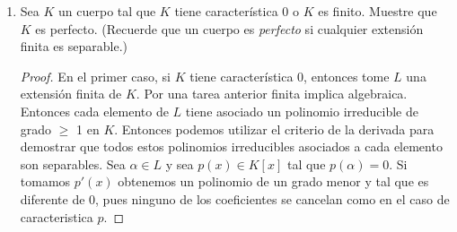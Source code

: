 \documentclass[letter,twoside,12pt]{article}
\begin{document}
\begin{enumerate}
\begin{enumerate}
\begin{proof}
Que era el resultado que estabamos buscando. Por lo tanto $ S $ es un campo y como contiene a todas las raices del polinomo $ f_n(x) $ entonces debe coincidir con el campo de descomposición $ \mathbb{F}_{p^n} $ puesto que por definición es el mínimo campo que contiene a todas las raíces del polinomio dado.
\end{proof}
\item Muestre que $ |\mathbb{F}{p^n}| = p^n $ y que más aun $ F_{p^n} $ es el único cuerpo, módulo isomorfismo, con esta cardinalidad.
En otras palabras muestre que si $ L $ es un cuerpo tal que $ |L| = p_n $ entonces $ F_{p^n} \cong
L $.

\begin{proof}
Como el polinomio no tiene raíces repetidas su número de raíces es igual a su grado, es decir, $ |\mathbb{F}^{p^n}| =p^n$. Ahora para demostrar que cualquier otro campo $ L $ con tamaño $ p^n $ es esencialmente el mismo campo solo basta demostrar que para cualquier $ \alpha \in L $ se cumple que $ (\alpha)^{p^n}=\alpha $.

Debemos considerar dos casos. Si $ \alpha=0 $ entonces $ 0^{p^n} = 0 $. Si $ \alpha \not  = 0 $ entonces $ \alpha \in L^* $. Ya tenemos un teorema que nos dice que $ L^* $ es un grupo cíclico de tamaño $ p^n-1 $. Por lo tanto, por el teorema de Lagrange tenemos que $ \alpha^{p^n-1}=1 $. Finalmente multiplicando por $ \alpha $ a ambos lados obtenemos la expresión deseada.
\end{proof}

(\textit{Sugerencia: Muestre que si $ \alpha \in L $ entonces $ (\alpha)^{p^n}= \alpha $})
\end{enumerate}

\item Sea $ K $ un cuerpo tal que $ K $ tiene característica 0 o $ K $ es finito. Muestre que $ K $ es perfecto. (Recuerde
que un cuerpo es \textit{perfecto} si cualquier extensión finita es separable.)

\begin{proof}
En el primer caso, si $ K $ tiene característica 0, entonces tome $ L $ una extensión finita de $ K $. Por una tarea anterior finita implica algebraica. Entonces cada elemento  de $ L $ tiene asociado un polinomio irreducible de grado $ \geq $ 1 en $ K $. Entonces podemos utilizar el criterio de la derivada para demostrar que todos estos polinomios irreducibles asociados a cada elemento son separables. Sea $ \alpha \in L $ y sea $ p(x) \in K[x] $ tal que $ p(\alpha)=0 $. Si tomamos $ p'(x) $ obtenemos un polinomio de un grado menor y tal que es diferente de 0, pues ninguno de los coeficientes se cancelan como en el caso de caracteristica $ p $.


\end{proof}
\end{enumerate}
\end{document}
